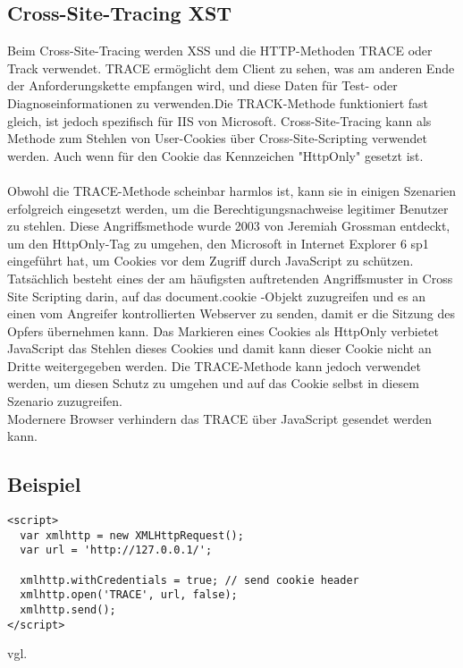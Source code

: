 {\subsection{Cross-Site-Tracing XST}
\label{sec:CSTXST}
Beim Cross-Site-Tracing werden XSS und die HTTP-Methoden TRACE oder Track verwendet. TRACE ermöglicht dem Client zu sehen, was am anderen Ende der Anforderungskette empfangen wird, und diese Daten für Test- oder Diagnoseinformationen zu verwenden.Die TRACK-Methode funktioniert fast gleich, ist jedoch spezifisch für IIS von Microsoft. Cross-Site-Tracing kann als Methode zum Stehlen von User-Cookies über Cross-Site-Scripting verwendet werden. Auch wenn für den Cookie das Kennzeichen "HttpOnly" gesetzt ist.
\\ \\
Obwohl die TRACE-Methode scheinbar harmlos ist, kann sie in einigen Szenarien erfolgreich eingesetzt werden, um die Berechtigungsnachweise legitimer Benutzer zu stehlen. Diese Angriffsmethode wurde 2003 von Jeremiah Grossman entdeckt, um den HttpOnly-Tag zu umgehen, den Microsoft in Internet Explorer 6 sp1 eingeführt hat, um Cookies vor dem Zugriff durch JavaScript zu schützen. Tatsächlich besteht eines der am häufigsten auftretenden Angriffsmuster in Cross Site Scripting darin, auf das document.cookie -Objekt zuzugreifen und es an einen vom Angreifer kontrollierten Webserver zu senden, damit er die Sitzung des Opfers übernehmen kann. Das Markieren eines Cookies als HttpOnly verbietet JavaScript das Stehlen dieses Cookies und damit kann dieser Cookie nicht an Dritte weitergegeben werden. Die TRACE-Methode kann jedoch verwendet werden, um diesen Schutz zu umgehen und auf das Cookie selbst in diesem Szenario zuzugreifen.
\\
Modernere Browser verhindern das TRACE über JavaScript gesendet werden kann.
\pagebreak
\subsection{Beispiel}
\label{sec:cst_bsp}
\begin{lstlisting}[caption={Cross Site Tracing}]
<script>
  var xmlhttp = new XMLHttpRequest();
  var url = 'http://127.0.0.1/';

  xmlhttp.withCredentials = true; // send cookie header
  xmlhttp.open('TRACE', url, false);
  xmlhttp.send();
</script>
\end{lstlisting}
vgl. \textcite{XST}
}
